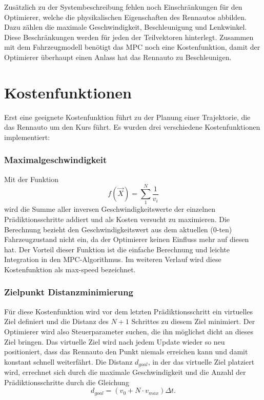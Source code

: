 \documentclass{like}
\begin{document}
Zusätzlich zu der Systembeschreibung fehlen noch Einschränkungen für den Optimierer, welche die physikalischen Eigenschaften des Rennautos abbilden.
Dazu zählen die maximale Geschwindigkeit, Beschleunigung und Lenkwinkel. 
Diese Beschränkungen werden für jeden der Teilvektoren hinterlegt. 
Zusammen mit dem Fahrzeugmodell benötigt das \ac{MPC} noch eine Kostenfunktion, damit der Optimierer überhaupt einen Anlass hat das Rennauto zu Beschleunigen.


\section{Kostenfunktionen}
\label{costFunctions}
Erst eine geeignete Kostenfunktion führt zu der Planung einer Trajektorie, die das Rennauto um den Kurs führt. Es wurden drei verschiedene Kostenfunktionen implementiert:

\subsubsection*{Maximalgeschwindigkeit}  
Mit der Funktion 
\begin{equation}
	f(\vec{X}) =  \sum_{1}^{N} \frac{1}{v_i}
\end{equation}
wird die Summe aller inversen Geschwindigkeitswerte der einzelnen Prädiktionsschritte addiert und als Kosten versucht zu maximieren.
Die Berechnung bezieht den Geschwindigkeitswert aus dem aktuellen (0-ten) Fahrzeugzustand nicht ein, da der Optimierer keinen Einfluss mehr auf diesen hat. Der Vorteil dieser Funktion ist die einfache Berechnung und leichte Integration in den \ac{MPC}-Algorithmus. Im weiteren Verlauf wird diese Kostenfunktion als max-speed bezeichnet.

\subsubsection*{Zielpunkt Distanzminimierung}
Für diese Kostenfunktion wird vor dem letzten Prädiktionsschritt ein virtuelles Ziel definiert und die Distanz des $N+1$ Schrittes zu diesem Ziel minimiert. Der Optimierer wird also Steuerparameter suchen, die ihn möglichst dicht an dieses Ziel bringen. Das virtuelle Ziel wird nach jedem Update wieder so neu positioniert, dass das Rennauto den Punkt niemals erreichen kann und damit konstant schnell weiterfährt. Die Distanz $d_{goal}$, in der das virtuelle Ziel platziert wird, errechnet sich durch die maximale Geschwindigkeit und die Anzahl der Prädiktionsschritte durch die Gleichung 
\begin{equation}
d_{goal} = \left(v_0 + N \cdot v_{max} \right) \Delta t.
\end{equation}
\end{document}
